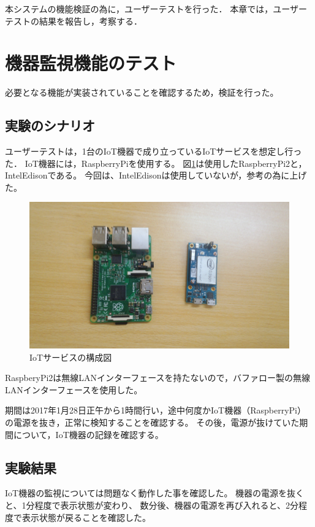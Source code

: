 本システムの機能検証の為に，ユーザーテストを行った．
本章では，ユーザーテストの結果を報告し，考察する．

\section{機器監視機能のテスト}
必要となる機能が実装されていることを確認するため，検証を行った。

\subsection{実験のシナリオ}
ユーザーテストは，1台のIoT機器で成り立っているIoTサービスを想定し行った．
IoT機器には，RaspberryPiを使用する。
図\ref{fig:device}は使用したRaspberryPi2と，IntelEdisonである。
今回は、IntelEdisonは使用していないが，参考の為に上げた。
\begin{figure}[htbp]
\includegraphics[width=14cm]{images/device.png}
\caption{IoTサービスの構成図}
\label{fig:device}
\end{figure}

RaspberyPi2は無線LANインターフェースを持たないので，バファロー製の無線LANインターフェースを使用した。

期間は2017年1月28日正午から1時間行い，途中何度かIoT機器（RaspberryPi）の電源を抜き，正常に検知することを確認する。
その後，電源が抜けていた期間について，IoT機器の記録を確認する。

\subsection{実験結果}
IoT機器の監視については問題なく動作した事を確認した。
機器の電源を抜くと、1分程度で表示状態が変わり、
数分後、機器の電源を再び入れると、2分程度で表示状態が戻ることを確認した。

